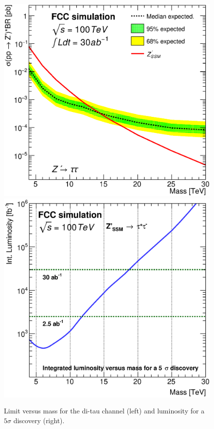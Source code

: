 \documentclass{cernrep}
\begin{document}
\begin{figure}
  \centering
  \includegraphics[width=0.45\columnwidth]{Fig/lim_Zprime_tautau_fcc_v02.eps}
    \includegraphics[width=0.45\columnwidth]{Fig/DiscoveryPotential_tautau_rootStyle.eps}
  \caption{Limit versus mass for the di-tau channel (left) and luminosity for a $5\sigma$ discovery (right). }
  \label{figure:leptonicresonances:resultstautau}
\end{figure}

\end{document}
